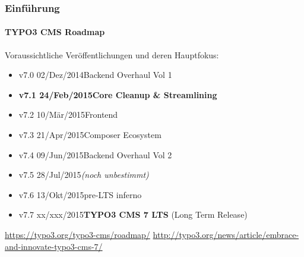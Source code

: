 
\begin{frame}[fragile]
	\frametitle{Einführung}
	\framesubtitle{TYPO3 CMS Roadmap}

	Voraussichtliche Veröffentlichungen und deren Hauptfokus:

	\begin{itemize}
		\item v7.0 \textrightarrow\tabto{1.3cm}02/Dez/2014\tabto{3.4cm}Backend Overhaul Vol 1
		\item \textbf{v7.1 \textrightarrow\tabto{1.3cm}24/Feb/2015\tabto{3.4cm}Core Cleanup \& Streamlining}
		\item v7.2 \textrightarrow\tabto{1.3cm}10/Mär/2015\tabto{3.4cm}Frontend
		\item v7.3 \textrightarrow\tabto{1.3cm}21/Apr/2015\tabto{3.4cm}Composer Ecosystem
		\item v7.4 \textrightarrow\tabto{1.3cm}09/Jun/2015\tabto{3.4cm}Backend Overhaul Vol 2
		\item v7.5 \textrightarrow\tabto{1.3cm}28/Jul/2015\tabto{3.4cm}\textit{(noch unbestimmt)}
		\item v7.6 \textrightarrow\tabto{1.3cm}13/Okt/2015\tabto{3.4cm}pre-LTS inferno
		\item v7.7 \textrightarrow\tabto{1.3cm}xx/xxx/2015\tabto{3.4cm}\textbf{TYPO3 CMS 7 LTS} (Long Term Release)
	\end{itemize}

	\smaller
		\url{https://typo3.org/typo3-cms/roadmap/}\newline
		\url{http://typo3.org/news/article/embrace-and-innovate-typo3-cms-7/}
	\normalsize

\end{frame}


